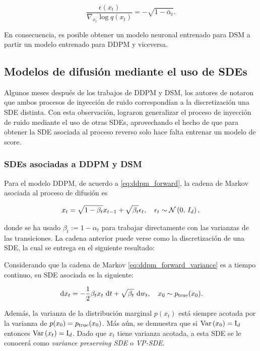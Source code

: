 \begin{equation*}
    \frac{\epsilon(x_t)}{\nabla_{x_t}\log q(x_t)} = -\sqrt{1-\bar\alpha_t}.
\end{equation*}

En consecuencia, es posible obtener un modelo neuronal entrenado para DSM a partir un modelo entrenado para DDPM y viceversa.

\subsection{Modelos de difusión mediante el uso de SDEs}
\label{dm/continuous_dm/sde_dm}

Algunos meses después de los trabajos de DDPM y DSM, los autores de \cite{song2021scorebased} notaron que ambos procesos de inyección de ruido correspondían a la discretización una SDE distinta. Con esta observación, lograron generalizar el proceso de inyección de ruido mediante el uso de otras SDEs, aprovechando el hecho de que para obtener la SDE asociada al proceso reverso solo hace falta entrenar un modelo de score.

\subsubsection{SDEs asociadas a DDPM y DSM}

Para el modelo DDPM, de acuerdo a \eqref{eq:ddpm_forward}, la cadena de Markov asociada al proceso de difusión es

\begin{equation}
    \label{eq:ddpm_forward_variance}
    x_t = \sqrt{1-\beta_t} x_{t-1} + \sqrt{\beta_t} \epsilon_t,\quad \epsilon_t\sim\mathcal{N}\left(0,\,I_d\right),
\end{equation}

donde se ha usado $\beta_t:=1-\alpha_t$ para trabajar directamente con las varianzas de las transiciones. La cadena anterior puede verse como la discretización de una SDE, la cual se entrega en el siguiente resultado:

\begin{prop}
    Considerando que la cadena de Markov \eqref{eq:ddpm_forward_variance} es a tiempo continuo, su SDE asociada es la siguiente:

    \begin{equation}
        \label{eq:ddpm_sde}
        \,\operatorname{d}\! x_t = -\frac{1}{2}\beta_t x_t \,\operatorname{d}\! t + \sqrt{\beta_t}\,\operatorname{d}\! w_t, \quad x_0\sim p_{\operatorname{true}}(x_0).
    \end{equation}

    Además, la varianza de la distribución marginal $p(x_t)$ está siempre acotada por la varianza de $p(x_0)=p_{\operatorname{true}}(x_0)$. Más aún, se demuestra que si $\operatorname{Var}\left(x_0\right)=\operatorname{I}_{d}$ entonces $\operatorname{Var}\left(x_t\right)=\operatorname{I}_{d}$. Dado que $x_t$ tiene varianza acotada, a esta SDE se le conocerá como \textit{variance preserving SDE} o \textit{VP-SDE}.
\end{prop}

